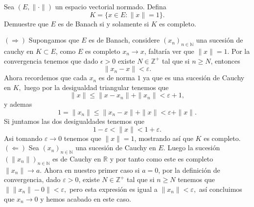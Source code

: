 Sea $(E, \| \cdot \|)$ un espacio vectorial normado. Defina
\[
K = \{x \in E : \|x\| = 1\}.
\]
Demuestre que $E$ es de Banach si y solamente si $K$ es completo.
\begin{sproof}
  $(\Rightarrow)$ Supongamos que $E$ es de Banach, considere $(x_n)_{n\in\mathbb{N}}$ una sucesión de cauchy en $K\subset E$, como $E$ es completo $x_n\to x$, faltaría ver que $\|x\|=1.$ Por la convergencia tenemos que dado $\epsilon>0$ existe $N\in\mathbb{Z}^+$ tal que si $n\geq N$, entonces
  $$\|x_n-x\|<\varepsilon.$$
  Ahora recordemos que cada $x_n$ es de norma $1$ ya que es una sucesión de Cauchy en $K,$ luego por la desigualdad triangular tenemos que
  $$\|x\|\leq \|x-x_n\|+\|x_n\|<\varepsilon+1,$$
  y ademas
  $$1=\|x_n\|\leq\|x_n-x\|+\|x\|<\varepsilon+\|x\|.$$
  Si juntamos las dos desigualdades tenemos que
  $$1-\varepsilon<\|x\|<1+\varepsilon.$$
  Asi tomando $\varepsilon\to 0$ tenemos que $\|x\|=1$, mostrando así que $K$ es completo.\\

  $(\Leftarrow)$ Sea $(x_n)_{n\in\mathbb{N}}$ una sucesión de Cauchy en $E.$ Luego la sucesión  $(\|x_n\|)_{n\in\mathbb{N}}$ es de Cauchy en $\mathbb{R}$ y por tanto como este es completo $\|x_n\|\to a.$ Ahora en nuestro primer caso si $a=0$, por la definición de convergencia, dado $\varepsilon>0$, existe $N\in\mathbb{Z^+}$ tal que si $n\geq N$ tenemos que $\|\|x_n\|-0\|<\varepsilon,$ pero esta expresión es igual a $\|x_n\|<\varepsilon,$ así concluimos que $x_n\to 0$ y hemos acabado en este caso.\\


\end{sproof}

